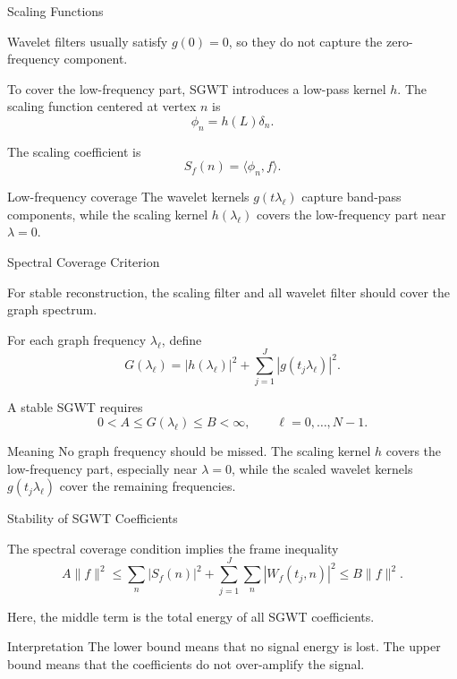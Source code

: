 \documentclass[aspectratio=1610,xcolor=dvipsnames,t]{beamer}
\newcommand{\inner}[2]{\langle #1,#2\rangle}
\begin{document}
\begin{frame}{Scaling Functions}

Wavelet filters usually satisfy $g(0)=0$, so they do not capture the zero-frequency component.

\medskip

To cover the low-frequency part, SGWT introduces a low-pass kernel $h$.
The scaling function centered at vertex $n$ is
\[
\phi_n
=
h(L)\delta_n.
\]

The scaling coefficient is
\[
S_f(n)
=
\inner{\phi_n}{f}.
\]

\begin{block}{Low-frequency coverage}
The wavelet kernels $g(t\lambda_\ell)$ capture band-pass components,
while the scaling kernel $h(\lambda_\ell)$ covers the low-frequency part near $\lambda=0$.
\end{block}

\end{frame}

\begin{frame}{Spectral Coverage Criterion}

For stable reconstruction, the scaling filter and all wavelet filter should cover the graph spectrum.

For each graph frequency $\lambda_\ell$, define
\[
G(\lambda_\ell)
=
|h(\lambda_\ell)|^2
+
\sum_{j=1}^{J}
|g(t_j\lambda_\ell)|^2.
\]

A stable SGWT requires
\[
0 < A
\leq
G(\lambda_\ell)
\leq
B < \infty,
\qquad
\ell=0,\dots,N-1.
\]

\begin{block}{Meaning}
No graph frequency should be missed.  
The scaling kernel $h$ covers the low-frequency part, especially near $\lambda=0$,
while the scaled wavelet kernels $g(t_j\lambda_\ell)$ cover the remaining frequencies.
\end{block}

\end{frame}

\begin{frame}{Stability of SGWT Coefficients}

The spectral coverage condition implies the frame inequality
\[
A\|f\|^2
\leq
\sum_n |S_f(n)|^2
+
\sum_{j=1}^{J}\sum_n |W_f(t_j,n)|^2
\leq
B\|f\|^2.
\]

Here, the middle term is the total energy of all SGWT coefficients.

\begin{block}{Interpretation}
The lower bound means that no signal energy is lost.
The upper bound means that the coefficients do not over-amplify the signal.
\end{block}

\end{frame}
\end{document}
